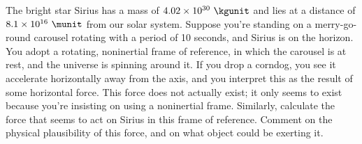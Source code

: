 The bright star Sirius has a mass of $4.02\times10^{30}\ \kgunit$ and lies at
a distance of $8.1\times10^{16}\ \munit$ from our solar system. Suppose you're
standing on a merry-go-round carousel rotating with a period of 10 seconds,
and Sirius is on the horizon.
You adopt a rotating, noninertial frame of reference, in which the carousel
is at rest, and the universe is spinning around it. If you drop a corndog, you see
it accelerate horizontally away from the axis, and you interpret this as the
result of some horizontal force. This force does not actually exist; it only
seems to exist because you're insisting on using a noninertial frame.
Similarly, calculate the force that seems to act on Sirius in this frame of reference.
Comment on the physical plausibility of this force, and on what object could
be exerting it.\answercheck
